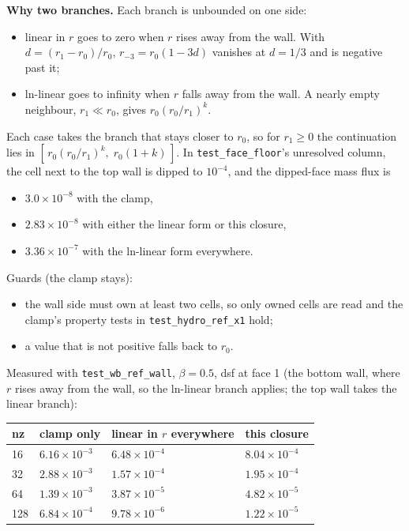 \documentclass[11pt,a4paper]{article}
\begin{document}
\textbf{Why two branches.} Each branch is unbounded on one side:
\begin{itemize}
\item linear in $r$ goes to zero when $r$ rises away from the wall. With $d = (r_1 - r_0)/r_0$, $r_{-3} = r_0(1 - 3d)$
  vanishes at $d = 1/3$ and is negative past it;
\item ln-linear goes to infinity when $r$ falls away from the wall. A nearly empty neighbour, $r_1 \ll r_0$, gives
  $r_0(r_0/r_1)^k$.
\end{itemize}

Each case takes the branch that stays closer to $r_0$, so for $r_1 \ge 0$ the continuation lies in
$[\,r_0(r_0/r_1)^k,\; r_0(1+k)\,]$. In \texttt{test\_face\_floor}'s unresolved column, the cell next to the top wall is
dipped to $10^{-4}$, and the dipped-face mass flux is
\begin{itemize}
\item $3.0\times10^{-8}$ with the clamp,
\item $2.83\times10^{-8}$ with either the linear form or this closure,
\item $3.36\times10^{-7}$ with the ln-linear form everywhere.
\end{itemize}

Guards (the clamp stays):
\begin{itemize}
\item the wall side must own at least two cells, so only owned cells are read and the clamp's property tests in
  \texttt{test\_hydro\_ref\_x1} hold;
\item a value that is not positive falls back to $r_0$.
\end{itemize}

Measured with \texttt{test\_wb\_ref\_wall}, $\beta = 0.5$, dsf at face 1 (the bottom wall, where $r$ rises away from the
wall, so the ln-linear branch applies; the top wall takes the linear branch):

\begin{longtable}{llll}
\toprule
nz & clamp only & linear in $r$ everywhere & this closure \\
\midrule
16 & $6.16\times10^{-3}$ & $6.48\times10^{-4}$ & $8.04\times10^{-4}$ \\
32 & $2.88\times10^{-3}$ & $1.57\times10^{-4}$ & $1.95\times10^{-4}$ \\
64 & $1.39\times10^{-3}$ & $3.87\times10^{-5}$ & $4.82\times10^{-5}$ \\
128 & $6.84\times10^{-4}$ & $9.78\times10^{-6}$ & $1.22\times10^{-5}$ \\
\bottomrule
\end{longtable}
\end{document}
